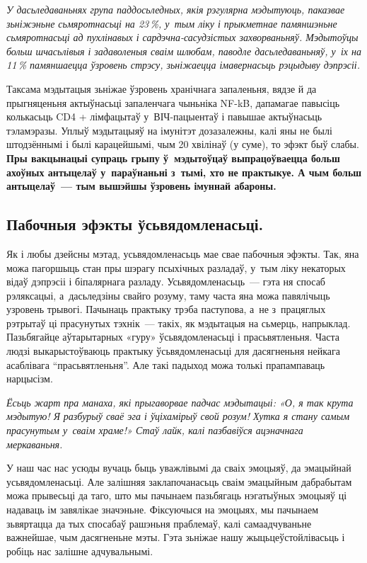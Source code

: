 \emph{У дасьледаваньнях група паддосьледных, якія рэгулярна мэдытуюць, паказвае зьніжэньне сьмяротнасьці на 23\,\%, у~тым ліку і прыкметнае памяншэньне сьмяротнасьці ад пухлінавых і сардэчна-сасудзістых захворваньняў. Мэдытоўцы больш шчасьлівыя і задаволеныя сваім шлюбам, паводле дасьледаваньняў, у~іх на 11\,\% памяншаецца ўзровень стрэсу, зьніжаецца імавернасьць рэцыдыву дэпрэсіі.}

Таксама мэдытацыя зьніжае ўзровень хранічнага запаленьня, вядзе й да прыгняценьня актыўнасьці запаленчага чыньніка NF-kB, дапамагае павысіць колькасьць CD4 + лімфацытаў у~ВІЧ-пацыентаў і павышае актыўнасьць тэламэразы. Уплыў мэдытацыяў на імунітэт дозазалежны, калі яны не былі штодзённымі і былі карацейшымі, чым 20 хвілінаў (у суме), то эфэкт быў слабы. \textbf{Пры вакцынацыі супраць грыпу ў~мэдытоўцаў выпрацоўваецца больш ахоўных антыцелаў у~параўнаньні з~тымі, хто не практыкуе. А чым больш антыцелаў~--- тым вышэйшы ўзровень імуннай абароны.}

\subsection*{Пабочныя эфэкты ўсьвядомленасьці.}

Як і любы дзейсны мэтад, усьвядомленасьць мае свае пабочныя эфэкты. Так, яна можа пагоршыць стан пры шэрагу псыхічных разладаў, у~тым ліку некаторых відаў дэпрэсіі і біпалярнага разладу. Усьвядомленасьць~--- гэта ня спосаб рэляксацыі, а~дасьледзіны свайго розуму, таму часта яна можа павялічыць узровень трывогі. Пачынаць практыку трэба паступова, а~не з~працяглых рэтрытаў ці прасунутых тэхнік~--- такіх, як мэдытацыя на сьмерць, напрыклад. Пазьбягайце аўтарытарных «гуру» ўсьвядомленасьці і прасьвятленьня. Часта людзі выкарыстоўваюць практыку ўсьвядомленасьці для дасягненьня нейкага асаблівага ``прасьвятленьня''. Але такі падыход можа толькі прапампаваць нарцысізм.

\emph{Ёсьць жарт пра манаха, які прыгаворвае падчас мэдытацыі: «О, я так крута мэдытую! Я разбурыў сваё эга і ўціхамірыў свой розум! Хутка я стану самым прасунутым у~сваім храме!» Стаў лайк, калі пазбавіўся ацэначнага меркаваньня.}

У наш час нас усюды вучаць быць уважлівымі да сваіх эмоцыяў, да эмацыйнай усьвядомленасьці. Але залішняя заклапочанасьць сваім эмацыйным дабрабытам можа прывесьці да таго, што мы пачынаем пазьбягаць нэгатыўных эмоцыяў ці надаваць ім завялікае значэньне. Фіксуючыся на эмоцыях, мы пачынаем зьвяртацца да тых спосабаў рашэньня праблемаў, калі самаадчуваньне важнейшае, чым дасягненьне мэты. Гэта зьніжае нашу жыцьцеўстойлівасьць і робіць нас залішне адчувальнымі.


